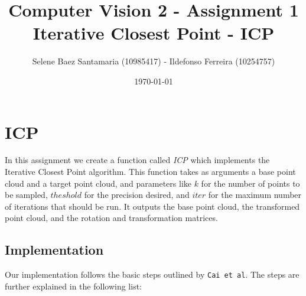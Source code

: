 \documentclass[11pt]{article}
\title{
	{Computer Vision 2 - Assignment 1\\
	 Iterative Closest Point - ICP}
}
\author{
Selene Baez Santamaria (10985417) - Ildefonso Ferreira (10254757)}
\date{\today}
\begin{document}
\maketitle

\section{ICP}
In this assignment we create a function called \textit{ICP} which implements the Iterative Closest Point algorithm. This function takes as arguments a base point cloud and a target point cloud, and parameters like $k$ for the number of points to be sampled, $theshold$ for the precision desired, and $iter$ for the maximum number of iterations that should be run. It outputs the base point cloud, the transformed point cloud, and the rotation and transformation matrices.

\subsection{Implementation}
Our implementation follows the basic steps outlined by \texttt{Cai et al}. The steps are further explained in the following list:
\end{document}
